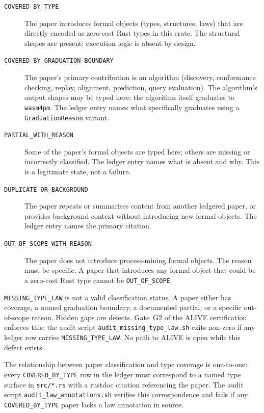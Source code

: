 \begin{description}
  \item[\texttt{COVERED\_BY\_TYPE}] The paper introduces formal objects (types, structures,
    laws) that are directly encoded as zero-cost Rust types in this crate. The structural
    shapes are present; execution logic is absent by design.

  \item[\texttt{COVERED\_BY\_GRADUATION\_BOUNDARY}] The paper's primary contribution is an
    algorithm (discovery, conformance checking, replay, alignment, prediction, query
    evaluation). The algorithm's output shapes may be typed here; the algorithm itself
    graduates to \texttt{wasm4pm}. The ledger entry names what specifically graduates using
    a \texttt{GraduationReason} variant.

  \item[\texttt{PARTIAL\_WITH\_REASON}] Some of the paper's formal objects are typed here;
    others are missing or incorrectly classified. The ledger entry names what is absent and
    why. This is a legitimate state, not a failure.

  \item[\texttt{DUPLICATE\_OR\_BACKGROUND}] The paper repeats or summarises content from
    another ledgered paper, or provides background context without introducing new formal
    objects. The ledger entry names the primary citation.

  \item[\texttt{OUT\_OF\_SCOPE\_WITH\_REASON}] The paper does not introduce process-mining
    formal objects. The reason must be specific. A paper that introduces any formal object
    that could be a zero-cost Rust type cannot be \texttt{OUT\_OF\_SCOPE}.
\end{description}

\begin{remark}
\label{rem:missing-type-law}
\texttt{MISSING\_TYPE\_LAW} is not a valid classification status. A paper either has
coverage, a named graduation boundary, a documented partial, or a specific out-of-scope
reason. Hidden gaps are defects. Gate~G2 of the ALIVE certification enforces this: the
audit script \texttt{audit\_missing\_type\_law.sh} exits non-zero if any ledger row
carries \texttt{MISSING\_TYPE\_LAW}. No path to ALIVE is open while this defect exists.
\end{remark}

The relationship between paper classification and type coverage is one-to-one: every
\texttt{COVERED\_BY\_TYPE} row in the ledger must correspond to a named type surface in
\texttt{src/*.rs} with a rustdoc citation referencing the paper. The audit script
\texttt{audit\_law\_annotations.sh} verifies this correspondence and fails if any
\texttt{COVERED\_BY\_TYPE} paper lacks a law annotation in source.

